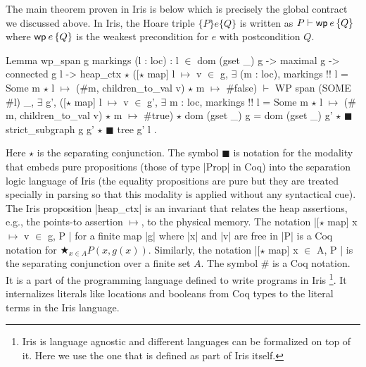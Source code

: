 \documentclass[]{scrartcl}
\begin{document}
The main theorem proven in Iris is  below
which is precisely the global contract we discussed above.
In Iris, the Hoare triple $\{P\}e\{Q\}$ is written as $P \vdash \wpre{e}{Q}$
where $\wpre{e}{Q}$ is the weakest precondition for
$e$ with postcondition $Q$.
\begin{Coq}
Lemma wp_span g markings (l : loc) :
    l $\in$ dom (gset _) g -> maximal g -> connected g l ->
    heap_ctx $\star$
    ([$\star$ map] l $\mapsto$ v $\in$ g,
       $\exists$ (m : loc), markings !! l = Some m $\star$
          l $\mapsto$ ($\#$m, children_to_val v) $\star$ m $\mapsto$ $\#$false) $\vdash$
    WP span (SOME $\#$l)
    {{ _, $\exists$ g',
            ([$\star$ map] l $\mapsto$ v $\in$ g',
              $\exists$ m : loc, markings !! l = Some m $\star$
                l $\mapsto$ ($\#$m, children_to_val v) $\star$ m $\mapsto$ $\#$true)
           $\star$ dom (gset _) g = dom (gset _) g'
           $\star$ $\scriptscriptstyle\blacksquare$ strict_subgraph g g' $\star$ $\scriptscriptstyle\blacksquare$ tree g' l }}.
\end{Coq}
Here $\star$ is the separating conjunction. The symbol $\scriptscriptstyle\blacksquare$ is notation for the modality that
embeds pure propositions (those of type \Coqe|Prop| in Coq) into
the separation logic language of Iris (the equality propositions are pure but they are treated specially in parsing so that this modality is applied without any syntactical cue).
The Iris proposition \Coqe|heap_ctx| is an invariant that relates the heap
assertions, e.g., the points-to assertion $\mapsto$, to the physical memory.
The notation \Coqe|[$\star$ map] x $
\mapsto$ v $\in$ g, P | for a finite map \Coqe|g| where \Coqe|x| and \Coqe|v| are free in \Coqe|P| is a Coq notation for $
\bigstar_{x \in A} P(x, g(x))$.
Similarly, the notation \Coqe|[$\star$ map] x $\in$ A, P | is the separating
conjunction over a finite set $A$.
The symbol $\#$ is a Coq notation. It is a part of the programming
language defined to write programs in Iris
\footnote{Iris is language agnostic and different languages can be formalized on top of it. Here we use the one that is defined as part of Iris itself.}.
It internalizes literals like locations and booleans from Coq types to the literal terms in the Iris language.
\end{document}
